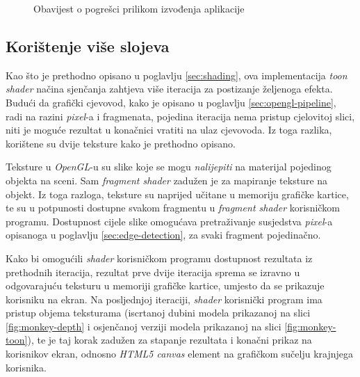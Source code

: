 \begin{figure}[H]
\centering{}
\caption{Obavijest o pogrešci prilikom izvođenja aplikacije}
\label{fig:interface-error}
\end{figure}

\subsection{Korištenje više slojeva}
\label{sec:multipass-rendering}

Kao što je prethodno opisano u poglavlju \ref{sec:shading}, ova implementacija \emph{toon shader} načina sjenčanja zahtjeva više iteracija za postizanje željenoga efekta. Budući da grafički cjevovod, kako je opisano u poglavlju \ref{sec:opengl-pipeline}, radi na razini \emph{pixel}-a i fragmenata, pojedina iteracija nema pristup cjelovitoj slici, niti je moguće rezultat u konačnici vratiti na ulaz cjevovoda. Iz toga razlika, korištene su dvije teksture kako je prethodno opisano.

Teksture u \emph{OpenGL}-u su slike koje se mogu \emph{nalijepiti} na materijal pojedinog objekta na sceni. Sam \emph{fragment shader} zadužen je za mapiranje teksture na objekt. Iz toga razloga, teksture su naprijed učitane u memoriju grafičke kartice, te su u potpunosti dostupne svakom fragmentu u \emph{fragment shader} korisničkom programu. Dostupnost cijele slike omogućava pretraživanje susjedstva \emph{pixel}-a opisanoga u poglavlju \ref{sec:edge-detection}, za svaki fragment pojedinačno.

Kako bi omogućili \emph{shader} korisničkom programu dostupnost rezultata iz prethodnih iteracija, rezultat prve dvije iteracija sprema se izravno u odgovarajuću teksturu u memoriji grafičke kartice, umjesto da se prikazuje korisniku na ekran. Na posljednjoj iteraciji, \emph{shader} korisnički program ima pristup objema teksturama (iscrtanoj dubini modela prikazanoj na slici \ref{fig:monkey-depth} i osjenčanoj verziji modela prikazanoj na slici \ref{fig:monkey-toon}), te je taj korak zadužen za stapanje rezultata i konačni prikaz na korisnikov ekran, odnosno \emph{HTML5 canvas} element na grafičkom sučelju krajnjega korisnika.

